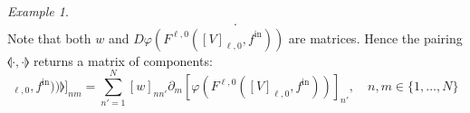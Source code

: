\documentclass[10pt, a4paper]{article}
\theoremstyle{plain}
\theoremstyle{definition}
\theoremstyle{definition}
\theoremstyle{definition}
\theoremstyle{definition}
\theoremstyle{definition}
\theoremstyle{definition}
\theoremstyle{definition}
\theoremstyle{remark}
\theoremstyle{remark}
\newtheorem{example}[theorem]{Example}
\theoremstyle{rudin-style-generic}
\theoremstyle{rudin-style-generic*}
\theoremstyle{rudin-style-theorem}
\newcommand*{\fin}{{f^{\text{in}}}}
\begin{document}
\begin{example}
\begin{equation}
\begin{aligned}
        .
    \end{aligned}
  \end{equation}
  Note that both $w$ and $D\varphi( F^{\ell,0}([V]_{\ell,0}, \fin )  )$ are matrices.
  Hence the pairing $\llangle\cdot,\cdot\rrangle$ returns a matrix of components:
  \begin{equation*}
    [\llangle w, D\varphi( F^{\ell,0}([V]_{\ell,0}, \fin )  )\rrangle]_{nm}
    = \sum_{n'=1}^N [w]_{nn'}  \partial_m [\varphi(F^{\ell,0}([V]_{\ell,0}, \fin )  ) ]_{n'}
    ,
    \quad n,m\in\{1,\dots,N\}
  \end{equation*}




  






\end{example}










%   
% 
     
\end{document}
